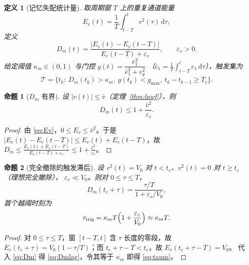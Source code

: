 \documentclass[11pt,a4paper]{article}
\newtheorem{definition}{定义}
\newtheorem{proposition}{命题}
\theoremstyle{remark}
\begin{document}
\begin{definition}[记忆失配统计量]\label{def:dm}
取周期窗 $T$ 上的重复通道能量
\begin{equation}
E_v(t)=\frac1T\int_{t-T}^{t}v^2(\tau)\,\mathrm d\tau ,
\label{eq:Ev}
\end{equation}
定义
\begin{equation}
D_m(t)=\frac{\bigl|E_v(t)-E_v(t-T)\bigr|}{E_v(t-T)+\varepsilon_v},
\qquad \varepsilon_v>0 .
\label{eq:Dm}
\end{equation}
给定阈值 $\kappa_m\in(0,1)$ 与门控 $g(t)=\dfrac{\bar e_1^2}{\bar e_1^2+\varepsilon_g^2}$
（$\bar e_1=\frac1T\int_{t-T}^{t}e_1\,\mathrm d\tau$），触发集为
\begin{equation}
\mathcal T=\{t_k:\ D_m(t_k)>\kappa_m,\ g(t_k)<g_{\max},\ t_k-t_{k-1}\ge T_c\}.
\label{eq:trigset}
\end{equation}
\end{definition}

\begin{proposition}[$D_m$ 有界]\label{prop:dmbound}
设 $|v(t)|\le\bar v$（定理~\ref{thm:lawf}），则
\begin{equation}
D_m(t)\le 1+\frac{\bar v^2}{\varepsilon_v}.
\label{eq:Dmbound}
\end{equation}
\end{proposition}
\begin{proof}
由 \eqref{eq:Ev}，$0\le E_v\le\bar v^2$。于是
$|E_v(t)-E_v(t-T)|\le E_v(t)+E_v(t-T)$，故
$D_m\le \frac{E_v(t)+E_v(t-T)}{E_v(t-T)+\varepsilon_v}
\le 1+\frac{\bar v^2}{\varepsilon_v}$。
\end{proof}

\begin{proposition}[完全撤除的触发滞后]\label{prop:dmlag}
设 $v^2(t)=V_0$ 对 $t<t_e$、$v^2(t)=0$ 对 $t\ge t_e$（理想完全撤除），
$\varepsilon_v\ll V_0$。则对 $0\le\tau\le T$，
\begin{equation}
D_m(t_e+\tau)=\frac{\tau/T}{1+\varepsilon_v/V_0},
\label{eq:Dmlag}
\end{equation}
首个越阈时刻为
\begin{equation}
\tau_{\mathrm{trig}}=\kappa_m T\Bigl(1+\frac{\varepsilon_v}{V_0}\Bigr)
\approx\kappa_m T .
\label{eq:taum}
\end{equation}
\end{proposition}
\begin{proof}
对 $0\le\tau\le T$，窗 $[t-T,t]$ 含 $\tau$ 长度的零段，故
$E_v(t_e+\tau)=V_0(1-\tau/T)$；而 $t_e+\tau-T<t_e$，故 $E_v(t_e+\tau-T)=V_0$。
代入 \eqref{eq:Dm} 得 \eqref{eq:Dmlag}，令其等于 $\kappa_m$ 即得 \eqref{eq:taum}。
\end{proof}
\end{document}
